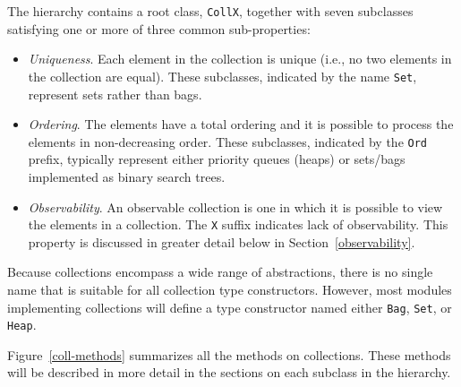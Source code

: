 \documentclass{report}
\newcommand{\cd}{\texttt}
\newcommand{\Section}[1]{Section~\ref{#1}}
\newcommand{\Figure}[1]{Figure~\ref{#1}}
\begin{document}
The hierarchy contains a root class, \cd{CollX}, together with seven
subclasses satisfying one or more of three common sub-properties:
%
\begin{itemize}
\item \emph{Uniqueness}.  Each element in the collection is unique (i.e.,
  no two elements in the collection are equal).  These subclasses,
  indicated by the name \cd{Set}, represent sets rather than bags.
\item \emph{Ordering}.  The elements have a total ordering and it is possible 
  to process the elements in non-decreasing order.  These subclasses,
  indicated by the \cd{Ord} prefix, typically represent either priority 
  queues (heaps) or sets/bags implemented as binary search trees.
\item \emph{Observability}.  An observable collection is one in which it is
  possible to view the elements in a collection.  The \cd{X} suffix
  indicates lack of observability.  This property is discussed in
  greater detail below in \Section{observability}.
\end{itemize}

Because collections encompass a wide range of abstractions, there is
no single name that is suitable for all collection type constructors.
However, most modules implementing collections will define a type constructor
named either \cd{Bag}, \cd{Set}, or \cd{Heap}.

\Figure{coll-methods} summarizes all the methods on collections.
These methods will be described in more detail in the sections on
each subclass in the hierarchy.
\end{document}
